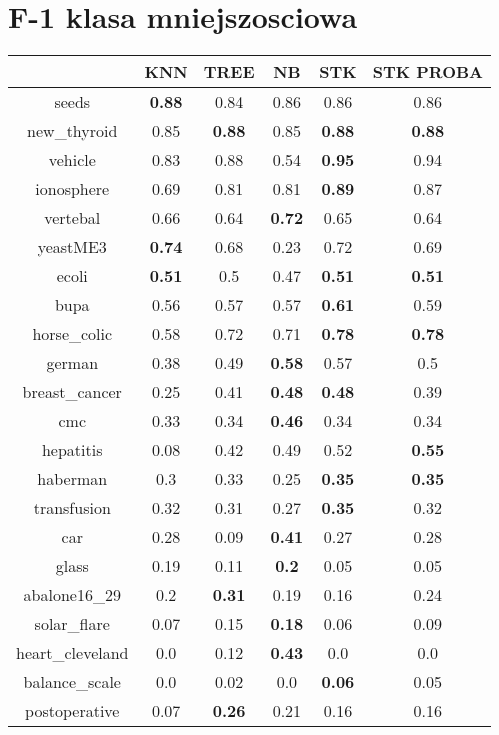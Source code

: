 \documentclass{article}%
\begin{document}
\section*{F{-}1 klasa mniejszosciowa}%
\begin{tabular}{c|ccccc}%
&KNN&TREE&NB&STK&STK PROBA\\%
\hline%
seeds&\textbf{0.88}&0.84&0.86&0.86&0.86\\%
new\_thyroid&0.85&\textbf{0.88}&0.85&\textbf{0.88}&\textbf{0.88}\\%
vehicle&0.83&0.88&0.54&\textbf{0.95}&0.94\\%
ionosphere&0.69&0.81&0.81&\textbf{0.89}&0.87\\%
vertebal&0.66&0.64&\textbf{0.72}&0.65&0.64\\%
yeastME3&\textbf{0.74}&0.68&0.23&0.72&0.69\\%
ecoli&\textbf{0.51}&0.5&0.47&\textbf{0.51}&\textbf{0.51}\\%
bupa&0.56&0.57&0.57&\textbf{0.61}&0.59\\%
horse\_colic&0.58&0.72&0.71&\textbf{0.78}&\textbf{0.78}\\%
german&0.38&0.49&\textbf{0.58}&0.57&0.5\\%
breast\_cancer&0.25&0.41&\textbf{0.48}&\textbf{0.48}&0.39\\%
cmc&0.33&0.34&\textbf{0.46}&0.34&0.34\\%
hepatitis&0.08&0.42&0.49&0.52&\textbf{0.55}\\%
haberman&0.3&0.33&0.25&\textbf{0.35}&\textbf{0.35}\\%
transfusion&0.32&0.31&0.27&\textbf{0.35}&0.32\\%
car&0.28&0.09&\textbf{0.41}&0.27&0.28\\%
glass&0.19&0.11&\textbf{0.2}&0.05&0.05\\%
abalone16\_29&0.2&\textbf{0.31}&0.19&0.16&0.24\\%
solar\_flare&0.07&0.15&\textbf{0.18}&0.06&0.09\\%
heart\_cleveland&0.0&0.12&\textbf{0.43}&0.0&0.0\\%
balance\_scale&0.0&0.02&0.0&\textbf{0.06}&0.05\\%
postoperative&0.07&\textbf{0.26}&0.21&0.16&0.16\\%
\end{tabular}

%
\end{document}
